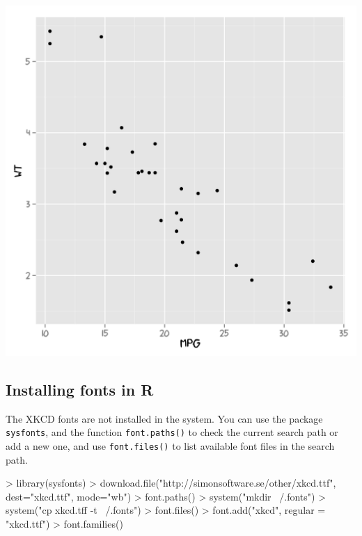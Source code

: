 \documentclass[10pt]{article}
\begin{document}
\begin{center}
\begin{Schunk}
\end{Schunk}
\includegraphics{xkcd-intro-003}
\end{center}

\subsection*{Installing fonts in R}



The XKCD fonts are not installed in the system. You can use the package \texttt{sysfonts}, and the function \texttt{font.paths()} to check the current search path or add a new one, and use \texttt{font.files()} to list available font files in the search path.

\begin{Schunk}
\begin{Sinput}
> library(sysfonts)
> download.file("http://simonsoftware.se/other/xkcd.ttf", dest="xkcd.ttf", mode="wb")
> font.paths()
> system("mkdir ~/.fonts")
> system("cp xkcd.tff -t ~/.fonts")
> font.files()
> font.add("xkcd",  regular = "xkcd.ttf")
> font.families()
\end{Sinput}
\end{Schunk}
\end{document}
